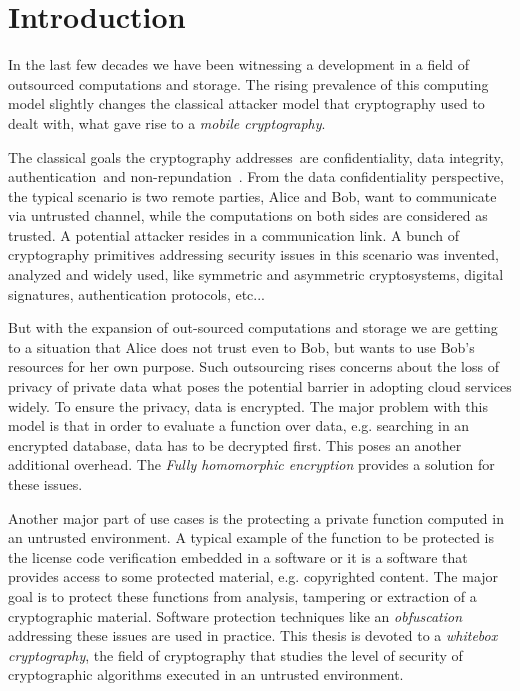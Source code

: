 \documentclass[11pt,oneside,final]{fithesis2}
\begin{document}
\tableofcontents


\chapter{Introduction}    
    In the last few decades we have been witnessing a development in a field of outsourced computations and storage.
    The rising prevalence of this computing model slightly changes the classical attacker model 
    that cryptography used to dealt with, what gave rise to a \emph{mobile cryptography}.

    The classical goals the cryptography addresses~are confidentiality, data integrity, authentication~and non-repundation~\citep{Menezes:1996:HAC:548089}.
    From the data confidentiality perspective, the typical scenario is two remote parties, Alice and Bob, want to communicate via untrusted channel, while the 
    computations on both sides are considered as trusted. A potential attacker resides in a communication link.
    A bunch of cryptography primitives addressing security issues in this scenario
    was invented, analyzed and widely used, like symmetric and asymmetric cryptosystems, digital signatures, authentication protocols, etc...
    
    But with the expansion of out-sourced computations and storage we are getting to a situation that Alice does not trust even to Bob, but wants 
    to use Bob's resources for her own purpose. Such outsourcing rises concerns about the loss of privacy of private data what poses the potential
    barrier in adopting cloud services widely. To ensure the privacy, data is encrypted. The major problem with this model 
    is that in order to evaluate a function over data, e.g. searching in an encrypted database, data has to be decrypted first. This poses an another additional 
    overhead. The \emph{Fully homomorphic encryption} provides a solution for these issues.
    
    Another major part of use cases is the protecting a private function computed in an untrusted environment. A typical example
    of the function to be protected is the license code verification embedded in a software or it is a software that provides access 
    to some protected material, e.g. copyrighted content.  The major goal is to protect these
    functions from analysis, tampering or extraction of a cryptographic material. Software protection techniques like an \emph{obfuscation}
    addressing these issues are used in practice. This thesis is devoted to a \emph{whitebox cryptography}, the field of 
    cryptography that studies the level of security of cryptographic algorithms executed in an untrusted environment.
\end{document}
